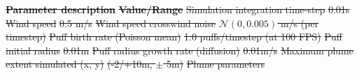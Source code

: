 \documentclass[5p,twocolumn,authoryear]{elsarticle}
\providecommand{\DIFdeltex}[1]{{\protect\color{red}\sout{#1}}}                      %
\providecommand{\DIFdelFL}[1]{\DIFdel{#1}} %
\providecommand{\DIFdel}[1]{\texorpdfstring{\DIFdeltex{#1}}{}} %
\begin{document}
\textbf{\DIFdelFL{Parameter description}} %
\textbf{\DIFdelFL{Value/Range}} %
\DIFdelFL{Simulation integration time-step }%
\DIFdelFL{0.01s  }%
\DIFdelFL{Wind speed }%
\DIFdelFL{0.5 m/s  }%
\DIFdelFL{Wind speed crosswind noise }%
\DIFdelFL{$\mathcal{N}(0, 0.005)$ m/s (per timestep)  }%
\DIFdelFL{Puff birth rate (Poisson mean) }%
\DIFdelFL{1.0 puffs/timestep (at 100 FPS)  }%
\DIFdelFL{Puff initial radius }%
\DIFdelFL{0.01m  }%
\DIFdelFL{Puff radius growth rate (diffusion) }%
\DIFdelFL{0.01m/s  }%
\DIFdelFL{Maximum plume extent simulated (x, y) }%
\DIFdelFL{(-2/+10m, $\pm$ 5m)  }%
{%
\DIFdelFL{Plume parameters}}
\end{document}

